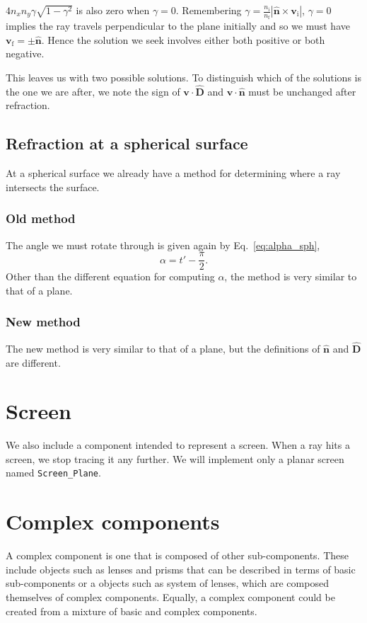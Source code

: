 \documentclass{article}
\let\vec \bm
\newcommand{\mrm}[1]{\mathrm{#1}}
\begin{document}
$4 n_x n_y \gamma \sqrt{1-\gamma^2}$ is also zero when $\gamma=0$. Remembering $\gamma = \frac{n_\mrm{i}}{n_\mrm{f}} |\vec{\hat{n}} \times \vec{v}_\mrm{i}|$, $\gamma=0$ implies the ray travels perpendicular to the plane initially and so we must have $\vec{v}_\mrm{f} = \pm \vec{\hat{n}}$. Hence the solution we seek involves either both positive or both negative.

This leaves us with two possible solutions. To distinguish which of the solutions is the one we are after, we note the sign of $\vec{v} \cdot \vec{\hat{D}}$ and $\vec{v} \cdot \vec{\hat{n}}$ must be unchanged after refraction.

\subsection{Refraction at a spherical surface}
At a spherical surface we already have a method for determining where a ray intersects the surface.
\subsubsection{Old method}
The angle we must rotate through is given again by Eq.~\ref{eq:alpha_sph},
\begin{equation}
    \alpha = t' - \frac{\pi}{2}.
\end{equation}
Other than the different equation for computing $\alpha$, the method is very similar to that of a plane.

\subsubsection{New method}
The new method is very similar to that of a plane, but the definitions of $\vec{\hat{n}}$ and $\vec{\hat{D}}$ are different.

\section{Screen}
We also include a component intended to represent a screen. When a ray hits a screen, we stop tracing it any further. We will implement only a planar screen named \texttt{Screen\_Plane}.

\section{Complex components}
A complex component is one that is composed of other sub-components. These include objects such as lenses and prisms that can be described in terms of basic sub-components or a objects such as system of lenses, which are composed themselves of complex components. Equally, a complex component could be created from a mixture of basic and complex components.
\end{document}
